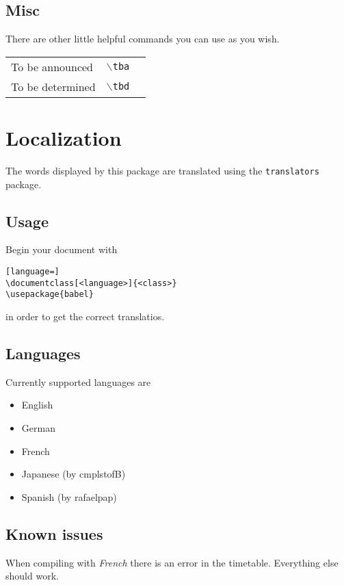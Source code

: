 \documentclass[english]{article}
\newcommand{\cmd}[1]{$\backslash$\texttt{{#1}}}
\begin{document}
	\subsection{Misc}
	\label{misc}
	There are other little helpful commands you can use as you wish.
	\begin{center}
		\begin{tabular}{lll}
			To be announced&\cmd{tba}&\tba\\
			To be determined&\cmd{tbd}&\tbd\\
		\end{tabular}
	\end{center}

	\pagebreak
	\section{Localization}
	The words displayed by this package are translated using the  \texttt{translators} package. 
	
	\subsection{Usage}
	Begin your document with
	\begin{lstlisting}[language=]
\documentclass[<language>]{<class>}
\usepackage{babel}
	\end{lstlisting}	
	in order to get the correct translatios.
	
	\subsection{Languages}
	Currently supported languages are
	\begin{itemize}
		\item 
		English
		
		\item
		German
		
		\item
		French
		
		\item
		Japanese (by cmplstofB)
		
		\item
		Spanish (by rafaelpap)
	\end{itemize}

	\subsection{Known issues}
	When compiling with \emph{French} there is an error in the timetable. Everything else should work.
	
\end{document}
